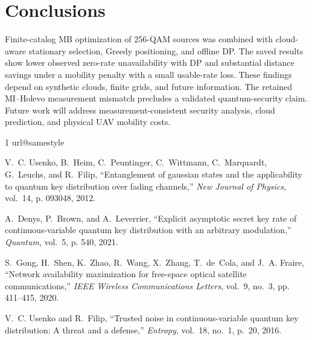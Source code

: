 \documentclass[conference,a4paper]{IEEEtran}
\begin{document}
\section{Conclusions}
\label{sec:conclusion}
Finite-catalog MB optimization of 256-QAM sources was combined with
cloud-aware stationary selection, Greedy positioning, and offline DP.
The saved results show lower observed zero-rate unavailability with DP
and substantial distance savings under a mobility penalty with a small
usable-rate loss. These findings depend on synthetic clouds, finite grids,
and future information. The retained MI--Holevo measurement mismatch
precludes a validated quantum-security claim. Future work will address
measurement-consistent security analysis, cloud prediction, and physical
UAV mobility costs.

\begin{thebibliography}{1}
\providecommand{\url}[1]{#1}
\csname url@samestyle\endcsname
\providecommand{\newblock}{\relax}
\providecommand{\bibinfo}[2]{#2}
\providecommand{\BIBentrySTDinterwordspacing}{\spaceskip=0pt\relax}
\providecommand{\BIBentryALTinterwordstretchfactor}{4}
\providecommand{\BIBentryALTinterwordspacing}{\spaceskip=\fontdimen2\font plus
\BIBentryALTinterwordstretchfactor\fontdimen3\font minus
  \fontdimen4\font\relax}
\providecommand{\BIBforeignlanguage}[2]{{%
\expandafter\ifx\csname l@#1\endcsname\relax
\typeout{** WARNING: IEEEtran.bst: No hyphenation pattern has been}%
\typeout{** loaded for the language `#1'. Using the pattern for}%
\typeout{** the default language instead.}%
\else
\language=\csname l@#1\endcsname
\fi
#2}}
\providecommand{\BIBdecl}{\relax}
\BIBdecl

V.~C. Usenko, B.~Heim, C.~Peuntinger, C.~Wittmann, C.~Marquardt, G.~Leuchs, and
  R.~Filip, ``Entanglement of gaussian states and the applicability to quantum
  key distribution over fading channels,'' \emph{New Journal of Physics},
  vol.~14, p. 093048, 2012.

A.~Denys, P.~Brown, and A.~Leverrier, ``Explicit asymptotic secret key rate of
  continuous-variable quantum key distribution with an arbitrary modulation,''
  \emph{Quantum}, vol.~5, p. 540, 2021.

S.~Gong, H.~Shen, K.~Zhao, R.~Wang, X.~Zhang, T.~de~Cola, and J.~A. Fraire,
  ``Network availability maximization for free-space optical satellite
  communications,'' \emph{IEEE Wireless Communications Letters}, vol.~9, no.~3,
  pp. 411--415, 2020.

V.~C. Usenko and R.~Filip, ``Trusted noise in continuous-variable quantum key
  distribution: A threat and a defense,'' \emph{Entropy}, vol.~18, no.~1,
  p.~20, 2016.

\end{thebibliography}
\end{document}
